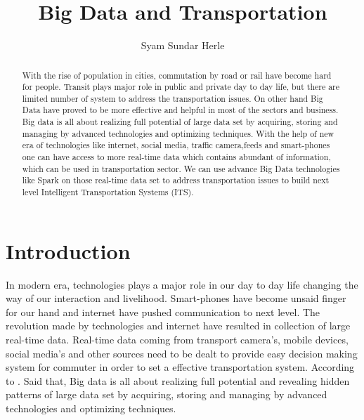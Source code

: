 \documentclass[sigconf]{acmart}
\begin{document}
\title{Big Data and Transportation}

\author{Syam Sundar Herle}

\begin{abstract}

With the rise of population in cities, commutation by road or rail have become hard for people. Transit plays major role in public and private day to day life, but there are limited number of system to address the transportation issues. On other hand Big Data have proved to be more effective and helpful in most of the sectors and business. Big data is all about realizing full potential of large data set by acquiring, storing and managing by advanced technologies and optimizing techniques. With the help of new era of technologies like internet, social media, traffic camera,feeds and smart-phones one can have access to more real-time data which contains abundant of information, which can be used in transportation sector. We can use advance Big Data technologies like Spark on those real-time data set to address transportation issues to build next level Intelligent Transportation Systems (ITS).
\end{abstract}


\maketitle

\section{Introduction}

In modern era, technologies plays a major role in our day to day life changing the way of our interaction and livelihood. Smart-phones have become unsaid finger for our hand and internet have pushed communication to next level. The revolution made by technologies and internet have resulted in collection of large real-time data. Real-time data coming from transport camera's, mobile devices, social media's and other sources need to be dealt to provide easy decision making system for commuter in order to set a effective transportation system. According to \cite{bdtrans} . Said that, Big data is all about realizing full potential and revealing hidden patterns of large data set by acquiring, storing and managing by advanced technologies and optimizing techniques. 
\end{document}
